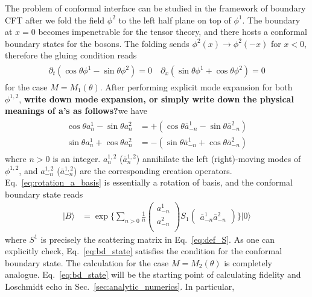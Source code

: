 The problem of conformal interface can be studied in the framework of boundary CFT\cite{cardy_boundary_2004,cardy_conformal_1984} after we fold the field $\phi^2$ to the left half plane on top of $\phi^1$\cite{oshikawa_boundary_2010}. The boundary at $x=0$ becomes impenetrable for the tensor theory, and there hosts a conformal boundary states for the bosons. The folding sends $\phi^2(x)\rightarrow\phi^2(-x)$ for $x<0$, therefore the gluing condition reads
\begin{eqnarray}\begin{aligned}
\partial_t(\cos\theta\phi^1-\sin\theta\phi^2)=0 \quad
\partial_x(\sin\theta\phi^1+\cos\theta\phi^2)=0 
\end{aligned}\end{eqnarray}
for the case $M=M_1(\theta)$. After performing explicit mode expansion for both $\phi^{1,2}$, {\bf\color{red}write down mode expansion, or simply write down the physical meanings of a's as follows?}we have
\begin{eqnarray}\begin{aligned}
\label{eq:rotation_a_basis}
\cos\theta a_n^1-\sin\theta a_n^2 &= +( \cos\theta\bar{a}_{-n}^1-\sin\theta \bar{a}_{-n}^2 ) \\
\sin\theta a_n^1+\cos\theta a_n^2 &= -( \sin\theta\bar{a}_{-n}^1+\cos\theta \bar{a}_{-n}^2 ) 
\end{aligned}\end{eqnarray}
where $n>0$ is an integer. $a_n^{1,2}$ ($\bar{a}_n^{1,2}$) annihilate the left (right)-moving modes of $\phi^{1,2}$, and $a_{-n}^{1,2}$ ($\bar{a}_{-n}^{1,2}$) are the corresponding creation operators. Eq.~\eqref{eq:rotation_a_basis} is essentially a rotation of basis, and the conformal boundary state reads\cite{oshikawa_boundary_2010}
\begin{equation}
\label{eq:bd_state}
\begin{aligned}
| B \rangle 
& =  \exp\Big\{ \sum_{n > 0 } \frac{1}{n}
\begin{pmatrix}
a_{-n}^1\\
a_{-n}^2\\                              
\end{pmatrix}
S_1
\begin{pmatrix}
\bar{a}_{-n}^1  \bar{a}_{-n}^2
\end{pmatrix} \Big\} |0\rangle
\end{aligned}
\end{equation}
where $S^1$ is precisely the scattering matrix in Eq.~\eqref{eq:def_S}. As one can explicitly check, Eq.~\eqref{eq:bd_state} satisfies the condition for the conformal boundary state\cite{oshikawa_boundary_2010}. The calculation for the case $M=M_2(\theta)$ is completely analogue. Eq.~\eqref{eq:bd_state} will be the starting point of calculating fidelity and Loschmidt echo in Sec.~\ref{sec:analytic_numerics}. In particular, 
